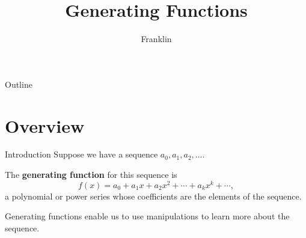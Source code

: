 \documentclass[aspectratio=169]{beamer}
\title{Generating Functions}
\author{Franklin}
\date{}
\begin{document}

\begin{frame}
\titlepage
\end{frame}

\begin{frame}{Outline}
  \tableofcontents
\end{frame}


\section{Overview}
\frame{\sectionpage}

\begin{frame}{Introduction}
  Suppose we have a sequence $a_0, a_1, a_2, \dots$. \pause
  
  The \textbf{generating function} for this sequence is
  \[
    f(x) = a_0 + a_1x + a_2 x^2 + \cdots + a_k x^k + \cdots,
  \]
  a polynomial or power series whose coefficients are the elements of the sequence. \pause

  Generating functions enable us to use manipulations to learn more about the sequence.
  
\end{frame}
\end{document}
